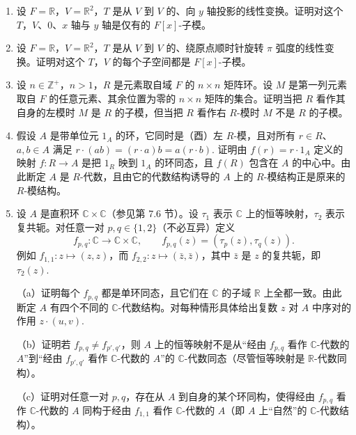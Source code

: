 \begin{enumerate}
\item 设 \(F = \mathbb{R}\)，\(V = \mathbb{R}^2\)，\(T\) 是从 \(V\) 到 \(V\) 的、向 \(y\) 轴投影的线性变换。证明对这个 \(T\)，\(V\)、0、\(x\) 轴与 \(y\) 轴是仅有的 \(F[x]\)-子模。

\item 设 \(F = \mathbb{R}\)，\(V = \mathbb{R}^2\)，\(T\) 是从 \(V\) 到 \(V\) 的、绕原点顺时针旋转 \(\pi\) 弧度的线性变换。证明对这个 \(T\)，\(V\) 的每个子空间都是 \(F[x]\)-子模。

\item 设 \(n \in \mathbb{Z}^+\)，\(n > 1\)，\(R\) 是元素取自域 \(F\) 的 \(n \times n\) 矩阵环。设 \(M\) 是第一列元素取自 \(F\) 的任意元素、其余位置为零的 \(n \times n\) 矩阵的集合。证明当把 \(R\) 看作其自身的左模时 \(M\) 是 \(R\) 的子模，但当把 \(R\) 看作右 \(R\)-模时 \(M\) 不是 \(R\) 的子模。

\item 假设 \(A\) 是带单位元 \(1_A\) 的环，它同时是（酉）左 \(R\)-模，且对所有 \(r \in R\)、\(a, b \in A\) 满足 \(r \cdot (ab) = (r \cdot a)b = a(r \cdot b)\). 证明由 \(f(r) = r \cdot 1_A\) 定义的映射 \(f : R \to A\) 是把 \(1_R\) 映到 \(1_A\) 的环同态，且 \(f(R)\) 包含在 \(A\) 的中心中。由此断定 \(A\) 是 \(R\)-代数，且由它的代数结构诱导的 \(A\) 上的 \(R\)-模结构正是原来的 \(R\)-模结构。

\item 设 \(A\) 是直积环 \(\mathbb{C} \times \mathbb{C}\)（参见第 7.6 节）。设 \(\tau_1\) 表示 \(\mathbb{C}\) 上的恒等映射，\(\tau_2\) 表示复共轭。对任意一对 \(p, q \in \{1, 2\}\)（不必互异）定义
\[
f_{p,q} : \mathbb{C} \longrightarrow \mathbb{C} \times \mathbb{C}, \qquad f_{p,q}(z) = (\tau_p(z), \tau_q(z)).
\]
例如 \(f_{1,1} : z \mapsto (z, z)\)，而 \(f_{2,2} : z \mapsto (\bar{z}, \bar{z})\)，其中 \(\bar{z}\) 是 \(z\) 的复共轭，即 \(\tau_2(z)\).

（a）证明每个 \(f_{p,q}\) 都是单环同态，且它们在 \(\mathbb{C}\) 的子域 \(\mathbb{R}\) 上全都一致。由此断定 \(A\) 有四个不同的 \(\mathbb{C}\)-代数结构。对每种情形具体给出复数 \(z\) 对 \(A\) 中序对的作用 \(z \cdot (u, v)\).

（b）证明若 \(f_{p,q} \neq f_{p',q'}\)，则 \(A\) 上的恒等映射不是从“经由 \(f_{p,q}\) 看作 \(\mathbb{C}\)-代数的 \(A\)”到“经由 \(f_{p',q'}\) 看作 \(\mathbb{C}\)-代数的 \(A\)”的 \(\mathbb{C}\)-代数同态（尽管恒等映射是 \(\mathbb{R}\)-代数同构）。

（c）证明对任意一对 \(p, q\)，存在从 \(A\) 到自身的某个环同构，使得经由 \(f_{p,q}\) 看作 \(\mathbb{C}\)-代数的 \(A\) 同构于经由 \(f_{1,1}\) 看作 \(\mathbb{C}\)-代数的 \(A\)（即 \(A\) 上“自然”的 \(\mathbb{C}\)-代数结构）。
\end{enumerate}

